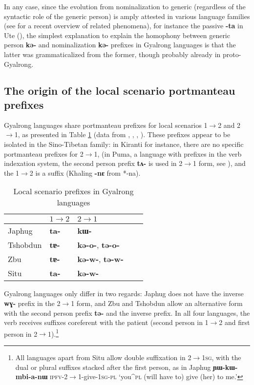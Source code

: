 \documentclass[oneside,a4paper,11pt]{article}
\newcommand{\ipa}[1]{\textbf{\phon\mbox{#1}}} %
\begin{document}
In any case, since the evolution from nominalization to generic (regardless of the syntactic role of the generic person) is amply attested in various language families (see \citealt{sanso14nmlz} for a recent overview of related phenomena), for instance the passive \ipa{-ta} in Ute (\citealt[264-7]{givon11ute}), the simplest explanation to explain the homophony between generic person \ipa{kə-} and nominalization \ipa{kə-} prefixes in Gyalrong languages is that the latter was grammaticalized from the former, though probably already in proto-Gyalrong.

\subsection{The origin of the local scenario portmanteau prefixes}

Gyalrong languages share portmanteau prefixes for local scenarios 1$\rightarrow$2 and 2$\rightarrow$1, as presented in Table \ref{tab:local.rgy} (data from \citealt[218]{linxr93jiarong}, \citealt{jackson02rentongdengdi}, \citealt{jacques12agreement}, \citealt{gongxun14agreement}). These prefixes appear to be isolated in the Sino-Tibetan family: in Kiranti for instance, there are no specific portmanteau prefixes for 2$\rightarrow$1, (in Puma, a language with prefixes in the verb indexation system, the second person prefix \ipa{tʌ-} is used in 2$\rightarrow$1 form, see \citealt{bickel07puma}), and the 1$\rightarrow$2 is a suffix (Khaling \ipa{-nɛ} from *-na).

\begin{table}
\caption{Local scenario prefixes in Gyalrong languages} \centering \label{tab:local.rgy} 
\begin{tabular}{lllll}
\toprule
& $1\rightarrow2$ & $2\rightarrow1$ \\
\midrule
Japhug &  \ipa{ta-} & \ipa{kɯ-} \\
Tshobdun &  \ipa{tɐ-} & \ipa{kə-o-}, \ipa{tə-o-} \\
Zbu &  \ipa{tɐ-} &\ipa{kə-w-}, \ipa{tə-w-} \\
Situ &  \ipa{ta-} & \ipa{kə-w-} \\
\bottomrule
\end{tabular}
\end{table}

Gyalrong languages only differ in two regards: Japhug does not have the inverse \ipa{wɣ-} prefix in the  2$\rightarrow$1 form, and Zbu and Tshobdun allow an alternative form with the second person prefix \ipa{tə-} and the inverse prefix. In all four languages, the verb receives suffixes coreferent with the patient (second person in 1$\rightarrow$2 and first person in  2$\rightarrow$1).\footnote{All languages apart from Situ allow double suffixation in 2$\rightarrow$\textsc{1sg}, with the dual or plural suffixes stacked after the first person, as in Japhug \ipa{ɲɯ-kɯ-mbi-a-nɯ} \textsc{ipfv}-2$\rightarrow$1-give-\textsc{1sg-pl} `you^{\textsc{pl}} (will have to) give (her) to me.'}
\end{document}
